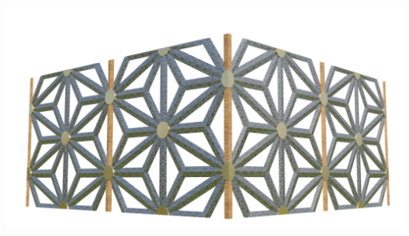 \begin{table}[htb]
\begin{tabularx}
              {\includegraphics[width=1\linewidth]{Images/Base Module/Pattern3}} \\


\end{tabularx}
\end{table}
